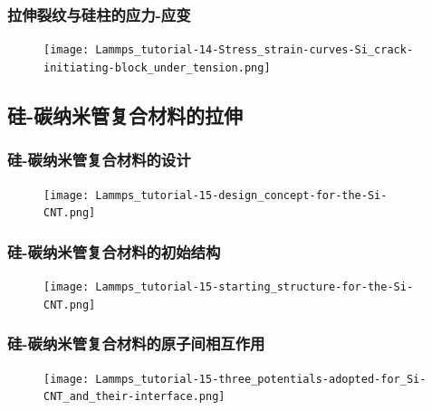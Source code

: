 \frame
{
	\frametitle{拉伸裂纹与硅柱的应力-应变}
\begin{figure}[h!]
\centering
\vskip -5pt
\texttt{[image: Lammps\_tutorial-14-Stress\_strain-curves-Si\_crack-initiating-block\_under\_tension.png]}
\caption{\fontsize{6.2pt}{5.2pt}}%
\label{LAMMPS_Stress_strain-of-Si_bar-with-various_initial_crack_sizes}
\end{figure}
}

\subsection{硅-碳纳米管复合材料的拉伸}
\frame
{
	\frametitle{硅-碳纳米管复合材料的设计}
\begin{figure}[h!]
\centering
\vskip -8pt
\texttt{[image: Lammps\_tutorial-15-design\_concept-for-the-Si-CNT.png]}
\caption{\fontsize{6.2pt}{5.2pt}}%
\label{LAMMPS_Design_concept-for-Si_CNT.}
\end{figure}
}


\frame
{
	\frametitle{硅-碳纳米管复合材料的初始结构}
\begin{figure}[h!]
\centering
\vskip -10pt
\texttt{[image: Lammps\_tutorial-15-starting\_structure-for-the-Si-CNT.png]}
\caption{\fontsize{6.2pt}{5.2pt}}%
\label{LAMMPS_Starting-structure-of-Si_CNT.}
\end{figure}
}


\frame
{
	\frametitle{硅-碳纳米管复合材料的原子间相互作用}
\begin{figure}[h!]
\centering
\vskip -5pt
\texttt{[image: Lammps\_tutorial-15-three\_potentials-adopted-for\_Si-CNT\_and\_their-interface.png]}
\caption{\fontsize{6.2pt}{5.2pt}}%
\label{LAMMPS_Potential-Si-CNT}
\end{figure}
}

